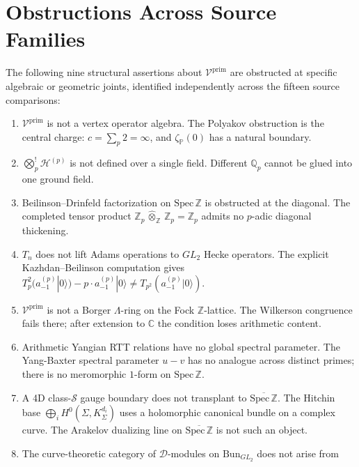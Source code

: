 \section{Obstructions Across Source Families}
\label{v4-arith:app:B:falsifications}

The following nine structural assertions about
\(\mathcal{V}^{\mathrm{prim}}\) are obstructed at specific algebraic
or geometric joints, identified independently across the fifteen source
comparisons:

\begin{enumerate}
\item $\mathcal{V}^{\mathrm{prim}}$ is not a vertex operator algebra.
The Polyakov obstruction is the central charge:
$c=\sum_{p}2=\infty$, and $\zeta_{\mathbb{P}}(0)$
has a natural boundary.
\item \(\bigotimes^{!}_{p}\mathcal{H}^{(p)}\) is not defined over a
single field. Different \(\mathbb{Q}_{p}\) cannot be glued into one
ground field.
\item Beilinson--Drinfeld factorization on
\(\mathrm{Spec}\,\mathbb{Z}\) is obstructed at the diagonal. The
completed tensor product
\(\mathbb{Z}_{p}\,\widehat{\otimes}_{\mathbb{Z}}\,\mathbb{Z}_{p}=\mathbb{Z}_{p}\)
admits no $p$-adic diagonal thickening.
\item \(T_{n}\) does not lift Adams operations to \(GL_{2}\) Hecke
operators. The explicit Kazhdan--Beilinson computation gives
\(T_{p}^{2}(a^{(p)}_{-1}|0\rangle)-p\cdot a^{(p)}_{-1}|0\rangle\neq T_{p^{2}}(a^{(p)}_{-1}|0\rangle)\).
\item $\mathcal{V}^{\mathrm{prim}}$ is not a Borger $\Lambda$-ring on
the Fock \(\mathbb{Z}\)-lattice. The Wilkerson congruence fails there;
after extension to \(\mathbb{C}\) the condition loses arithmetic
content.
\item Arithmetic Yangian RTT relations have no global spectral
parameter. The Yang-Baxter spectral parameter
$u-v$ has no analogue across distinct primes; there is no meromorphic
$1$-form on $\mathrm{Spec}\,\mathbb{Z}$.
\item A 4D class-\(\mathcal{S}\) gauge boundary does not transplant to
\(\overline{\mathrm{Spec}\,\mathbb{Z}}\). The Hitchin base
\(\bigoplus_i H^0(\Sigma,K_\Sigma^{d_i})\) uses a holomorphic
canonical bundle on a complex curve. The Arakelov dualizing line on
\(\overline{\mathrm{Spec}\,\mathbb Z}\) is not such an object.
\item The curve-theoretic category of \(\mathcal{D}\)-modules on
\(\mathrm{Bun}_{GL_{2}}\) does not arise from

\end{enumerate}
